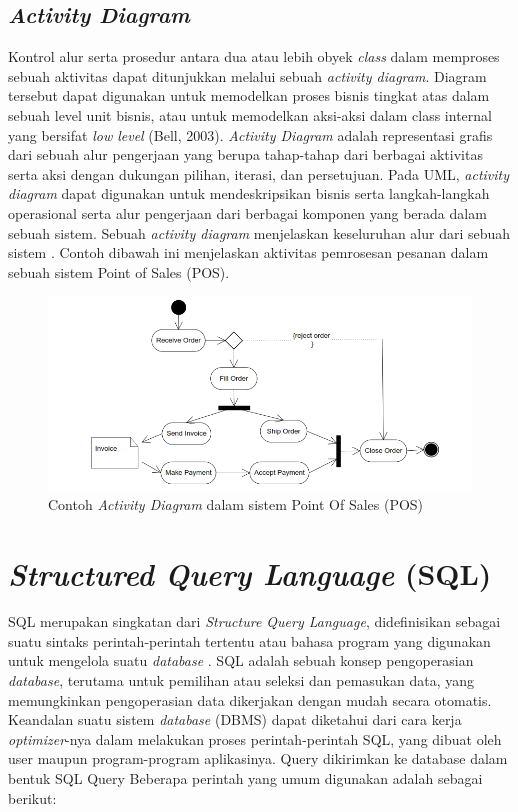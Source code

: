 	\subsection{\emph{Activity Diagram}}
		Kontrol alur serta prosedur antara dua atau lebih obyek \emph{class} dalam memproses sebuah aktivitas dapat ditunjukkan melalui sebuah \emph{activity diagram}. Diagram tersebut dapat digunakan untuk memodelkan proses bisnis tingkat atas dalam sebuah level unit bisnis, atau untuk memodelkan aksi-aksi dalam class internal yang bersifat \emph{low level} (Bell, 2003). \emph{Activity Diagram} adalah representasi grafis dari sebuah alur pengerjaan yang berupa tahap-tahap dari berbagai aktivitas serta aksi dengan dukungan pilihan, iterasi, dan persetujuan. Pada UML, \emph{activity diagram} dapat digunakan untuk mendeskripsikan bisnis serta langkah-langkah operasional serta alur pengerjaan dari berbagai komponen yang berada dalam sebuah sistem. Sebuah \emph{activity diagram} menjelaskan keseluruhan alur dari sebuah sistem \cite{lee}. Contoh dibawah ini menjelaskan aktivitas pemrosesan pesanan dalam sebuah sistem Point of Sales (POS).  
		\begin{figure}[H]
			\centering
			\includegraphics[width=1\textwidth]{gambar/sample-activity-diagram}
			\caption{Contoh \textit{Activity Diagram} dalam sistem Point Of Sales (POS)}
		\end{figure}
\section{\emph{Structured Query Language} (SQL)}
	SQL merupakan singkatan dari \emph{Structure Query Language}, didefinisikan sebagai suatu sintaks perintah-perintah tertentu atau bahasa program yang digunakan untuk mengelola suatu \emph{database} \cite{anisya}. SQL adalah sebuah konsep pengoperasian \emph{database}, terutama untuk pemilihan atau seleksi dan pemasukan data, yang memungkinkan pengoperasian data dikerjakan dengan mudah secara otomatis. Keandalan suatu sistem \emph{database} (DBMS) dapat diketahui dari cara kerja \emph{optimizer}-nya dalam melakukan proses perintah-perintah SQL, yang dibuat oleh user maupun program-program aplikasinya. 
	Query dikirimkan ke database dalam bentuk SQL Query Beberapa perintah yang umum digunakan adalah sebagai berikut:
	
